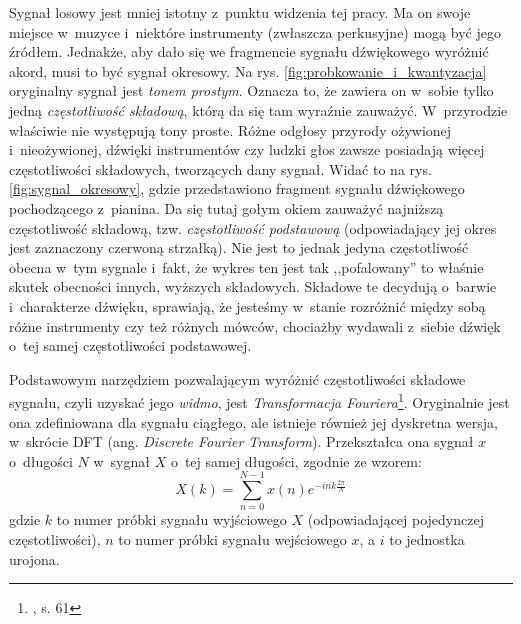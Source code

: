 Sygnał losowy jest mniej istotny z~punktu widzenia tej pracy. Ma on swoje miejsce w~muzyce i~niektóre instrumenty (zwłaszcza perkusyjne) mogą być jego źródłem. Jednakże, aby dało się we fragmencie sygnału dźwiękowego wyróżnić akord, musi to być sygnał okresowy. Na rys. \ref{fig:probkowanie_i_kwantyzacja} oryginalny sygnał jest \emph{tonem prostym}. Oznacza to, że zawiera on w~sobie tylko jedną \emph{częstotliwość składową}, którą da się tam wyraźnie zauważyć. W~przyrodzie właściwie nie występują tony proste. Różne odgłosy przyrody ożywionej i~nieożywionej, dźwięki instrumentów czy ludzki głos zawsze posiadają więcej częstotliwości składowych, tworzących dany sygnał. Widać to na rys. \ref{fig:sygnal_okresowy}, gdzie przedstawiono fragment sygnału dźwiękowego pochodzącego z~pianina. Da się tutaj gołym okiem zauważyć najniższą częstotliwość składową, tzw. \emph{częstotliwość podstawową} (odpowiadający jej okres jest zaznaczony czerwoną strzałką). Nie jest to jednak jedyna częstotliwość obecna w~tym sygnale i~fakt, że wykres ten jest tak ,,pofalowany'' to właśnie skutek obecności innych, wyższych składowych. Składowe te decydują o~barwie i~charakterze dźwięku, sprawiają, że jesteśmy w~stanie rozróżnić między sobą różne instrumenty czy też różnych mówców, chociażby wydawali z~siebie dźwięk o~tej samej częstotliwości podstawowej. 

Podstawowym narzędziem pozwalającym wyróżnić częstotliwości składowe sygnału, czyli uzyskać jego \emph{widmo}, jest \emph{Transformacja Fouriera}\footnote{\cite{lyons_wprowadzenie_2000}, s. 61}. Oryginalnie jest ona zdefiniowana dla sygnału ciągłego, ale istnieje również jej dyskretna wersja, w~skrócie DFT (ang. \emph{Discrete Fourier Transform}). Przekształca ona sygnał $x$ o~długości $N$ w~sygnał $X$ o~tej samej długości, zgodnie ze wzorem:
\begin{equation} \label{eq:dft}
    X(k) = \sum_{n=0}^{N-1} x(n) e^{-ink \frac{2 \pi}{N}}
\end{equation}
gdzie $k$ to numer próbki sygnału wyjściowego $X$ (odpowiadającej pojedynczej częstotliwości), $n$ to numer próbki sygnału wejściowego $x$, a $i$ to jednostka urojona.

